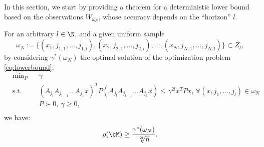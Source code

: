 

%


In this section, we start by providing a theorem for a deterministic lower bound based on the observations $W_{\omega_N}$, whose accuracy depends on the ``horizon'' $l$.

\begin{theorem}\label{thm:lowerbound}
For an arbitrary $l \in \N,$ and a given uniform sample $$\omega_N := \{(x_1, j_{1,1},\dots,j_{1,l}), (x_2, j_{2,1},\dots,j_{2,l}), \ldots, (x_N, j_{N,1},\dots,j_{N,l})\} \subset Z_l,$$ 
by considering $\gamma^*(\omega_N)$ the optimal solution of the optimization problem \eqref{eq:lowerbound}:
\begin{equation}
\begin{aligned}
& \text{min}_P & & \gamma \\
& \text{s.t.} 
&  & (A_{j_l} A_{j_{l-1}} \dots A_{j_1} x)^T P (A_{j_l} A_{j_{l-1}} \dots A_{j_1} x) \leq \gamma^{2l} x^T P x,\,  \forall (x,j_1,\dots,j_l) \in \omega_N\\
& && P \succ 0,\ \gamma \geq 0, \\
\end{aligned}
\end{equation}
we have:
$$\rho(\cM) \geq \frac{\gamma^{*}(\omega_N)}{\sqrt[2l]{n}}.$$ 
\end{theorem}

